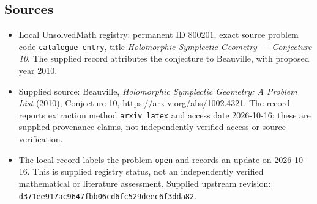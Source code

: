 \documentclass[11pt]{article}
\begin{document}
\subsection{Sources}
\begin{itemize}
\item Local UnsolvedMath registry: permanent ID \(800201\), exact source problem code \texttt{catalogue entry}, title \emph{Holomorphic Symplectic Geometry --- Conjecture 10}. The supplied record attributes the conjecture to Beauville, with proposed year 2010.
\item Supplied source: Beauville, \emph{Holomorphic Symplectic Geometry: A Problem List} (2010), Conjecture 10, \url{https://arxiv.org/abs/1002.4321}. The record reports extraction method \texttt{arxiv\_latex} and access date 2026-10-16; these are supplied provenance claims, not independently verified access or source verification.
\item The local record labels the problem \texttt{open} and records an update on 2026-10-16. This is supplied registry status, not an independently verified mathematical or literature assessment. Supplied upstream revision: \texttt{d371ee917ac9647fbb06cd6fc529deec6f3dda82}.
\end{itemize}
\end{document}
